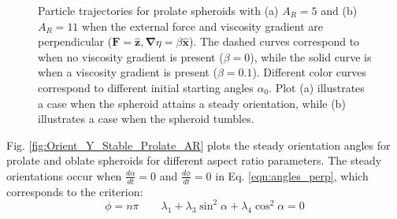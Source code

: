 \documentclass{jfm}
\begin{document}
\begin{figure}
\centering
{}
\caption{Particle trajectories for prolate spheroids with (a) $A_R =5$ and (b) $A_R =11$ when the external force and viscosity gradient are perpendicular ($\boldsymbol{F} = \boldsymbol{\hat{z}}, \boldsymbol{\nabla}\eta = \beta \boldsymbol{\hat{x}}$). The dashed curves correspond to when no viscosity gradient is present ($\beta = 0$), while the solid curve is when a viscosity gradient is present ($\beta = 0.1$). Different color curves correspond to different initial starting angles $\alpha_0$.  Plot (a) illustrates a case when the spheroid attains a steady orientation, while (b) illustrates a case when the spheroid tumbles.}
\label{fig:Translation_Y}
\end{figure}

Fig. \ref{fig:Orient_Y_Stable_Prolate_AR} plots the steady orientation angles for prolate and oblate spheroids for different aspect ratio parameters.  The steady orientations occur when $\frac{d \alpha}{dt} = 0$ and $\frac{d \phi}{d t} = 0$ in Eq. \eqref{eqn:angles_perp}, which corresponds to the criterion:
\begin{equation}
\phi = n\pi  \qquad \lambda_1 + \lambda_3 \sin^2\alpha + \lambda_4 \cos^2 \alpha = 0
\end{equation}
\end{document}
